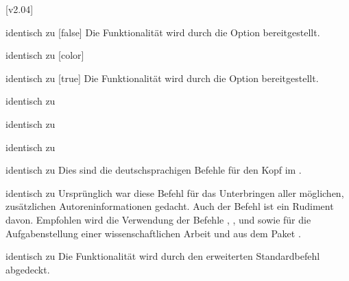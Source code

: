 \begin{Declaration*}{}
[v2.04]

\begin{Declaration}{}{%
  identisch zu [false]%
}
\printdeclarationlist*%
%
Die Funktionalität wird durch die Option  bereitgestellt.
\end{Declaration}

\begin{Declaration}{}{%
  identisch zu [color]%
}
\begin{Declaration}{}{%
  identisch zu [true]%
}
\printdeclarationlist*%
%
Die Funktionalität wird durch die Option  bereitgestellt.
\end{Declaration}
\end{Declaration}

\begin{Declaration}{}{%
  identisch zu 
}
\begin{Declaration}{}{%
  identisch zu 
}
\begin{Declaration}{}{%
  identisch zu 
}
\begin{Declaration}{}{%
  identisch zu 
}
\printdeclarationlist*%
%
Dies sind die deutschsprachigen Befehle für den Kopf im \CD.
\end{Declaration}
\end{Declaration}
\end{Declaration}
\end{Declaration}

\begin{Declaration}{}{%
  identisch zu %
}
\printdeclarationlist*%
%
Ursprünglich war diese Befehl für das Unterbringen aller möglichen, 
zusätzlichen Autoreninformationen gedacht. Auch der Befehl  
ist ein Rudiment davon. Empfohlen wird die Verwendung der Befehle 
, ,  und 
 sowie für die Aufgabenstellung einer 
wissenschaftlichen Arbeit  und  aus dem Paket 
.
\end{Declaration}

\begin{Declaration}{}{%
  identisch zu %
}
\printdeclarationlist*%
%
Die Funktionalität wird durch den erweiterten Standardbefehl  
abgedeckt.
\end{Declaration}


\end{Declaration*}
